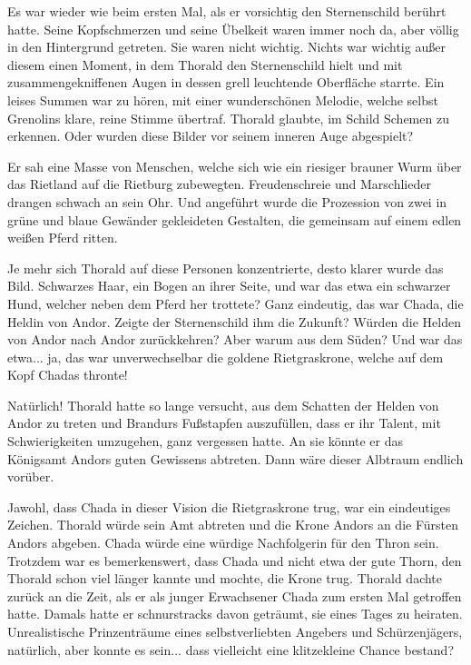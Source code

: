 Es war wieder wie beim ersten Mal, als er vorsichtig den Sternenschild berührt hatte. Seine Kopfschmerzen und seine Übelkeit waren immer noch da, aber völlig in den Hintergrund getreten. Sie waren nicht wichtig. Nichts war wichtig außer diesem einen Moment, in dem Thorald den Sternenschild hielt und mit zusammengekniffenen Augen in dessen grell leuchtende Oberfläche starrte. Ein leises Summen war zu hören, mit einer wunderschönen Melodie, welche selbst Grenolins klare, reine Stimme übertraf. Thorald glaubte, im Schild Schemen zu erkennen. Oder wurden diese Bilder vor seinem inneren Auge abgespielt?

Er sah eine Masse von Menschen, welche sich wie ein riesiger brauner Wurm über das Rietland auf die Rietburg zubewegten. Freudenschreie und Marschlieder drangen schwach an sein Ohr. Und angeführt wurde die Prozession von zwei in grüne und blaue Gewänder gekleideten Gestalten, die gemeinsam auf einem edlen weißen Pferd ritten.

Je mehr sich Thorald auf diese Personen konzentrierte, desto klarer wurde das Bild. Schwarzes Haar, ein Bogen an ihrer Seite, und war das etwa ein schwarzer Hund, welcher neben dem Pferd her trottete? Ganz eindeutig, das war Chada, die Heldin von Andor. Zeigte der Sternenschild ihm die Zukunft? Würden die Helden von Andor nach Andor zurückkehren? Aber warum aus dem Süden? Und war das etwa... ja, das war unverwechselbar die goldene Rietgraskrone, welche auf dem Kopf Chadas thronte!

Natürlich! Thorald hatte so lange versucht, aus dem Schatten der Helden von Andor zu treten und Brandurs Fußstapfen auszufüllen, dass er ihr Talent, mit Schwierigkeiten umzugehen, ganz vergessen hatte. An sie könnte er das Königsamt Andors guten Gewissens abtreten. Dann wäre dieser Albtraum endlich vorüber.

Jawohl, dass Chada in dieser Vision die Rietgraskrone trug, war ein eindeutiges Zeichen. Thorald würde sein Amt abtreten und die Krone Andors an die Fürsten Andors abgeben. Chada würde eine würdige Nachfolgerin für den Thron sein. Trotzdem war es bemerkenswert, dass Chada und nicht etwa der gute Thorn, den Thorald schon viel länger kannte und mochte, die Krone trug. Thorald dachte zurück an die Zeit, als er als junger Erwachsener Chada zum ersten Mal getroffen hatte. Damals hatte er schnurstracks davon geträumt, sie eines Tages zu heiraten. Unrealistische Prinzenträume eines selbstverliebten Angebers und Schürzenjägers, natürlich, aber konnte es sein... dass vielleicht eine klitzekleine Chance bestand?

